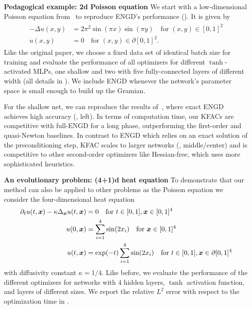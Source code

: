 \textbf{Pedagogical example: 2d Poisson equation}
We start with a low-dimensional Poisson equation from~\citet{muller2023achieving} to reproduce ENGD's performance ().
It is given by
\begin{align}\label{eq:2D-Poisson}
  \begin{split}
    -\Delta u(x,y) & = 2\pi^2 \sin(\pi x) \sin(\pi y) \quad \text{for } (x,y)\in[0,1]^2 \\
    u(x,y) & = 0 \quad \text{for } (x,y) \in\partial[0,1]^2.
  \end{split}
\end{align}
Like the original paper, we choose a fixed data set of identical batch size for training and evaluate the performance of all optimizers for different $\tanh$-activated MLPs, one shallow and two with five fully-connected layers of different width (all details in ).
We include ENGD whenever the network's parameter space is small enough to build up the Gramian.

For the shallow net, we can reproduce the results of~\cite{muller2023achieving}, where exact ENGD achieves high accuracy (, left).
In terms of computation time, our KFACs are competitive with full-ENGD for a long phase, outperforming the first-order and quasi-Newton baselines.
In contrast to ENGD which relies on an exact solution of the preconditioning step, KFAC scales to larger networks (, middle/center)
and is competitive to other second-order optimizers like Hessian-free, which uses more sophisticated heuristics.

\textbf{An evolutionary problem: (4+1)d heat equation}
To demonstrate that our method can also be applied to other problems as the Poisson equation we consider the four-dimensional heat equation
\begin{align}\label{eq:4D-heat}
  \begin{split}
    \partial_t u(t,{\bm{x}})-\kappa\Delta_{\bm{x}} u(t,{\bm{x}}) & = 0 \quad \text{for } t\in[0,1], {\bm{x}}\in [0,1]^{4} \\
    u(0,{\bm{x}}) & = \sum_{i=1}^{4} \sin(2 x_i) \quad \text{for }
               {\bm{x}}\in [0,1]^{4}
    \\
    u(t,{\bm{x}}) & = \exp(-t) \sum_{i=1}^{4} \sin(2 x_i) \quad \text{for } t\in[0,1], {\bm{x}}\in\partial[0,1]^{4}
  \end{split}
\end{align}
with diffusivity constant $\kappa = 1/4$.
Like before, we evaluate the performance of the different optimizers for networks with $4$ hidden layers, $\tanh$ activation function, and layers of different sizes.
We report the relative $L^2$ error with respect to the optimization time in .

